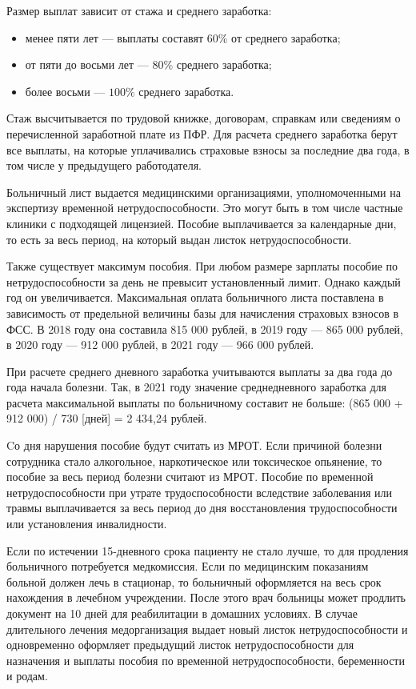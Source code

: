 \documentclass[14pt,a4paper]{extarticle}
\begin{document}
Размер выплат зависит от стажа и среднего заработка:
\begin{itemize}
	\item менее пяти лет — выплаты составят $60\%$ от среднего заработка;
	\item от пяти до восьми лет — $80\%$ среднего заработка; 
	\item более восьми — $100\%$ среднего заработка. 
\end{itemize}


Стаж высчитывается по трудовой книжке, договорам, справкам или сведениям о перечисленной заработной плате из ПФР. Для расчета среднего заработка берут все выплаты, на которые уплачивались страховые взносы за последние два года, в том числе у предыдущего работодателя.

Больничный лист выдается медицинскими организациями, уполномоченными на экспертизу временной нетрудоспособности. Это могут быть в том числе частные клиники с подходящей лицензией. Пособие выплачивается за календарные дни, то есть за весь период, на который выдан листок нетрудоспособности.

Также существует максимум пособия. При любом размере зарплаты пособие по нетрудоспособности за день не превысит установленный лимит. Однако каждый год он увеличивается. Максимальная оплата больничного листа поставлена в зависимость от предельной величины базы для начисления страховых взносов в ФСС. В 2018 году она составила 815 000 рублей, в 2019 году — 865 000 рублей, в 2020 году — 912 000 рублей, в 2021 году — 966 000 рублей.

При расчете среднего дневного заработка учитываются выплаты за два года до года начала болезни. Так, в 2021 году значение среднедневного заработка для расчета максимальной выплаты по больничному составит не больше: (865 000 + 912 000) / 730 [дней] = 2 434,24 рублей.

Cо дня нарушения пособие будут считать из МРОТ. Если причиной болезни сотрудника стало алкогольное, наркотическое или токсическое опьянение, то пособие за весь период болезни считают из МРОТ. Пособие по временной нетрудоспособности при утрате трудоспособности вследствие заболевания или травмы выплачивается за весь период до дня восстановления трудоспособности или установления инвалидности.

Если по истечении 15-дневного срока пациенту не стало лучше, то для продления больничного потребуется медкомиссия. Если по медицинским показаниям больной должен лечь в стационар, то больничный оформляется на весь срок нахождения в лечебном учреждении. После этого врач больницы может продлить документ на 10 дней для реабилитации в домашних условиях. В случае длительного лечения медорганизация выдает новый листок нетрудоспособности и одновременно оформляет предыдущий листок нетрудоспособности для назначения и выплаты пособия по временной нетрудоспособности, беременности и родам.
\end{document}
